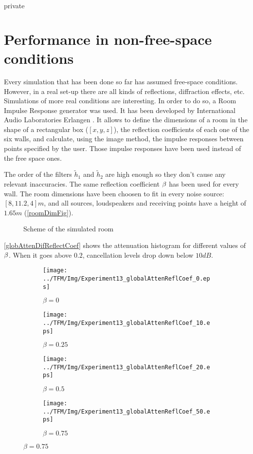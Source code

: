 \begin{shownto}{private} %
\section{Performance in non-free-space conditions}
Every simulation that has been done so far has assumed free-space conditions. However, in a real set-up there are all kinds of reflections, diffraction effects, etc. Simulations of more real conditions are interesting. In order to do so, a Room Impulse Response generator was used. It has been developed by International Audio Laboratories Erlangen \cite{RIRgenerator}. It allows to define the dimensions of a room in the shape of a rectangular box ($[x,y,z]$), the reflection coefficients of each one of the six walls, and calculate, using the image method, the impulse responses between points specified by the user. Those impulse responses have been used instead of the free space ones.

The order of the filters $\widetilde{h}_1$ and $\widetilde{h}_2$ are high enough so they don't cause any relevant inaccuracies. The same reflection coefficient $\beta$ has been used for every wall. The room dimensions have been choosen to fit in every noise source: $[8, 11.2, 4]\si{m}$, and all sources, loudspeakers and receiving points have a height of $1.65\si{m}$ (\autoref{roomDimFig}).

\begin{figure}
	\centering
\caption{Scheme of the simulated room}
\label{roomDimFig}
\end{figure}

\autoref{globAttenDifReflectCoef} shows the attenuation histogram for different values of $\beta$. When it goes above $0.2$, cancellation levels drop down below $10 \si{dB}$.

\begin{figure}[h]
	\centering
	\begin{subfigure}[b]{0.45\textwidth}
		\centering
		\texttt{[image: ../TFM/Img/Experiment13\_globalAttenReflCoef\_0.eps]}
		\caption{$\beta = 0$}
	\end{subfigure}
	\begin{subfigure}[b]{0.45\textwidth}
		\centering
		\texttt{[image: ../TFM/Img/Experiment13\_globalAttenReflCoef\_10.eps]}
		\caption{$\beta = 0.25$}
	\end{subfigure}
	\begin{subfigure}[b]{0.45\textwidth}
		\centering
		\texttt{[image: ../TFM/Img/Experiment13\_globalAttenReflCoef\_20.eps]}
		\caption{$\beta = 0.5$}
	\end{subfigure}
	\begin{subfigure}[b]{0.45\textwidth}
		\centering
		\texttt{[image: ../TFM/Img/Experiment13\_globalAttenReflCoef\_50.eps]}
		\caption{$\beta = 0.75$}
	\end{subfigure}
	

\end{figure}
\end{shownto}
